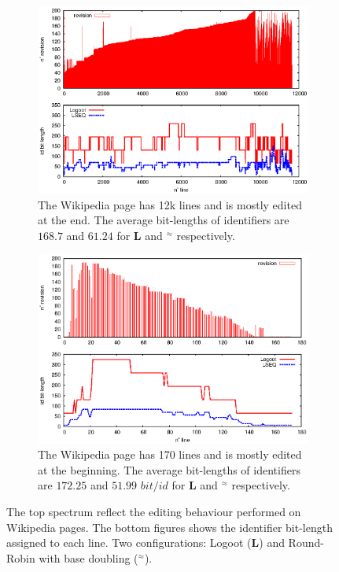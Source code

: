 \begin{figure}
\addtolength{\belowcaptionskip}{-5pt}
\begin{subfigure}[l]{0.47\textwidth}
  \includegraphics[width=\textwidth]{img/poste.eps}
  \caption{The Wikipedia page has 12k lines and is mostly edited at the
    end. The average bit-lengths of identifiers are $168.7$ and $61.24$ for
    \textbf{L} and \textbf{\NAME{}}$^\approx$ respectively.}
  \label{im:poste}
\end{subfigure}
\hfill
\begin{subfigure}[r]{0.47\textwidth}
\includegraphics[width=\textwidth]{img/didyouknow.eps}
\caption{The Wikipedia page has 170 lines and is mostly edited at the
  beginning. The average bit-lengths of identifiers are $172.25$ and $51.99$
  $bit/id$ for  \textbf{L} and \textbf{\NAME{}$^\approx$} respectively.}
\label{im:didyouknow}
\end{subfigure}
\caption{The top spectrum reflect the editing behaviour performed on Wikipedia
  pages. The bottom figures shows the identifier bit-length assigned to each
  line. Two configurations: Logoot (\textbf{L}) and Round-Robin with base
  doubling (\textbf{\NAME{}}$^\approx$).}
\end{figure}

